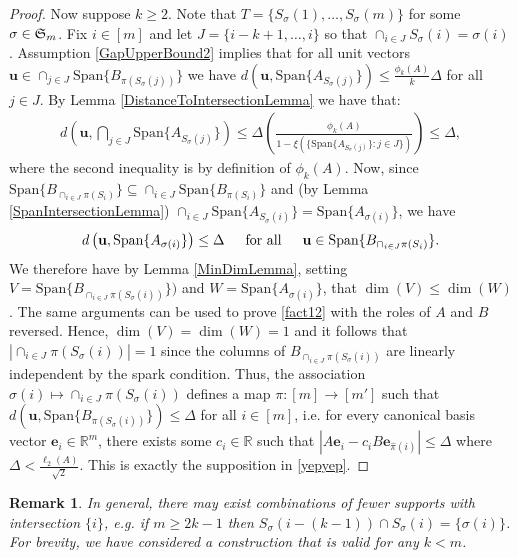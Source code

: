 \documentclass[journal, onecolumn]{IEEEtran}
\newtheorem{remark}{Remark}
\begin{document}
\begin{proof}
Now suppose $k \geq 2$. Note that $T = \{S_\sigma(1), \ldots, S_\sigma(m)\}$ for some $\sigma \in \frak{S}_m$. Fix $i \in [m]$ and let $J = \{i-k+1, \ldots, i\}$ so that $\cap_{i \in J} S_\sigma(i) = \sigma(i)$. Assumption \eqref{GapUpperBound2} implies that for all unit vectors $\mathbf{u} \in \cap_{j \in J} \text{Span}\{B_{\pi(S_\sigma(j))}\}$ we have $d(\mathbf{u}, \text{Span}\{A_{S_\sigma(j)}\}) \leq \frac{\phi_k(A)}{k} \Delta$ for all $j \in J$. By Lemma \ref{DistanceToIntersectionLemma} we have that:
\begin{align}\label{sym2}
d\left( \mathbf{u}, \bigcap_{j \in J} \text{Span}\{A_{S_{\sigma}(j)}\} \right) 
\leq \Delta \left( \frac{\phi_k(A)}{1 - \xi(\{ \text{Span}\{A_{S_{\sigma}(j)}\} : j \in J \})} \right) \leq \Delta,
\end{align}
%
where the second inequality is by definition of $\phi_k(A)$. Now, since $\text{Span}\{B_{\cap_{i \in J}\pi(S_i)}\} \subseteq \cap_{i \in J} \text{Span}\{B_{\pi(S_i)}\}$ and (by Lemma \ref{SpanIntersectionLemma}) $\cap_{i \in J}  \text{Span}\{A_{S_\sigma(i)}\} = \text{Span}\{A_{\sigma(i)}\}$, we have
\begin{align}\label{fact12}
d\left( \mathbf{u}, \text{Span}\{A_{\sigma(i)}\} \right) \leq \Delta \indent \text{for all} \indent \mathbf{u} \in \text{Span}\{B_{\cap_{i \in J}\pi(S_i)}\}.
\end{align}
We therefore have by Lemma \ref{MinDimLemma}, setting $V = \text{Span}\{B_{\cap_{i \in J}\pi(S_\sigma(i))}\})$ and $W = \text{Span}\{A_{\sigma(i)}\}$, that $\dim(V) \leq \dim(W)$. The same arguments can be used to prove \eqref{fact12} with the roles of $A$ and $B$ reversed. Hence, $\dim(V) = \dim(W) = 1$ and it follows that $|\cap_{i \in J} \pi(S_\sigma(i))| = 1$ since the columns of $B_{\cap_{i \in J} \pi(S_\sigma(i))}$ are linearly independent by the spark condition. Thus, the association $\sigma(i) \mapsto \cap_{i \in J} \pi(S_\sigma(i))$ defines a map $\pi: [m] \to [m']$ such that $d\left( \mathbf{u}, \text{Span}\{B_{ \pi(S_\sigma(i))}\}\right) \leq \Delta$ for all $i \in [m]$, i.e. for every canonical basis vector $\mathbf{e}_i \in \mathbb{R}^m$, there exists some $c_i \in \mathbb{R}$ such that $|A\mathbf{e}_i - c_iB\mathbf{e}_{\hat \pi(i)}| \leq \Delta$ where $\Delta < \frac{\ell_{2}(A)}{\sqrt{2}}$. This is exactly the supposition in \eqref{yepyep}.
\end{proof}

\begin{remark} In general, there may exist combinations of fewer supports with intersection $\{i\}$, e.g. if $m \geq 2k-1$ then $S_\sigma(i - (k-1)) \cap S_\sigma(i) = \{\sigma(i)\}$. For brevity, we have considered a construction that is valid for any $k < m$.
\end{remark}
\end{document}
